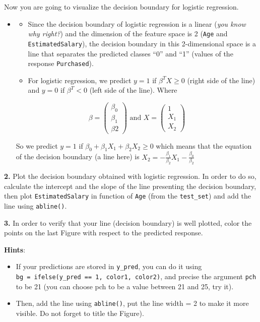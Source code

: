 \documentclass[]{book}
\providecommand{\tightlist}{%
  \setlength{\itemsep}{0pt}\setlength{\parskip}{0pt}}
\newenvironment{rmdblock}[1]
  {\begin{shaded*}
  \begin{itemize}
  \renewcommand{\labelitemi}{
    \raisebox{-.7\height}[0pt][0pt]{
      {\setkeys{Gin}{width=2em,keepaspectratio}\texttt{[image: img/icons/\#1]}}
    }
  }
  \item
  }
  {
  \end{itemize}
  \end{shaded*}
  }
\newenvironment{rmdinsight}
  {\begin{rmdblock}{insight}}
  {\end{rmdblock}}
\newcommand{\lt}{<}
\theoremstyle{definition}
\theoremstyle{definition}
\theoremstyle{definition}
\theoremstyle{remark}
\begin{document}
Now you are going to visualize the decision boundary for logistic
regression.

\begin{rmdinsight}
\begin{itemize}
\tightlist
\item
  Since the decision boundary of logistic regression is a linear
  (\emph{you know why right?}) and the dimension of the feature space is
  2 (\texttt{Age} and \texttt{EstimatedSalary}), the decision boundary
  in this 2-dimensional space is a line that separates the predicted
  classes ``0'' and ``1'' (values of the response \texttt{Purchased}).
\item
  For logistic regression, we predict \(y=1\) if \(\beta^T X \geq 0\)
  (right side of the line) and \(y=0\) if \(\beta^T \lt 0\) (left side
  of the line). Where
\end{itemize}

\[ \beta = \begin{pmatrix} \beta_0 \\ \beta_1 \\ \beta2 \end{pmatrix} \,\, \text{and} \,\, X = \begin{pmatrix}
  1 \\
  X_1 \\
  X_2
  \end{pmatrix}\]

So we predict \(y=1\) if \(\beta_0 + \beta_1 X_1 + \beta_2 X_2 \geq 0\)
which means that the equation of the decision boundary (a line here) is
\(X_2 = - \frac{\beta_1}{\beta_2}X_1 - \frac{\beta_0}{\beta_2}\)
\end{rmdinsight}

\textbf{2.} Plot the decision boundary obtained with logistic
regression. In order to do so, calculate the intercept and the slope of
the line presenting the decision boundary, then plot
\texttt{EstimatedSalary} in function of \texttt{Age} (from the
\texttt{test\_set}) and add the line using \texttt{abline()}.

\textbf{3.} In order to verify that your line (decision boundary) is
well plotted, color the points on the last Figure with respect to the
predicted response.

\textbf{Hints}:

\begin{itemize}
\tightlist
\item
  If your predictions are stored in \texttt{y\_pred}, you can do it
  using
  \texttt{bg\ =\ ifelse(y\_pred\ ==\ 1,\ \textquotesingle{}color1\textquotesingle{},\ \textquotesingle{}color2\textquotesingle{})},
  and precise the argument \texttt{pch} to be 21 (you can choose pch to
  be a value between 21 and 25, try it).
\item
  Then, add the line using \texttt{abline()}, put the line width = 2 to
  make it more visible. Do not forget to title the Figure).
\end{itemize}
\end{document}
